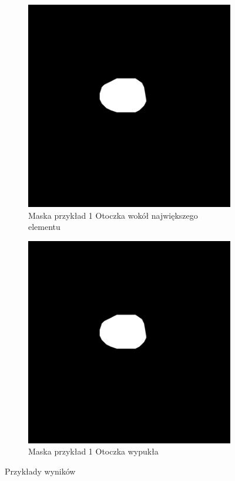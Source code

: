 \documentclass[a4paper,11pt,twoside]{report}
\theoremstyle{definition}
\begin{document}
\begin{figure}[htb]
	\medskip
	\begin{subfigure}{0.25\textwidth}
		\includegraphics[width=\linewidth]{Mask/1/hull.png}
		\caption{Maska przykład 1 Otoczka wokół największego elementu}
		\label{fig:3}
	\end{subfigure}\hfil %
	\begin{subfigure}{0.25\textwidth}
		\includegraphics[width=\linewidth]{Mask/1/hull.png}
		\caption{Maska przykład 1 Otoczka wypukła}
		\label{fig:4}
	\end{subfigure}\hfil %

	\caption{Przykłady wyników}
	\label{fig:images}
\end{figure}
\end{document}
